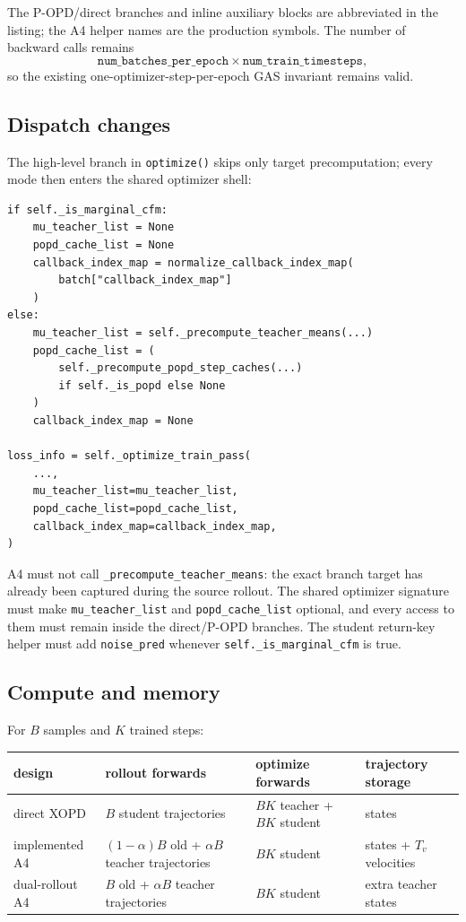 \documentclass[11pt,a4paper]{article}
\theoremstyle{plain}
\theoremstyle{definition}
\begin{document}
The P-OPD/direct branches and inline auxiliary blocks are abbreviated in the listing; the A4
helper names are the production symbols.  The number of backward calls remains
\[
\texttt{num\_batches\_per\_epoch}
\times
\texttt{num\_train\_timesteps},
\]
so the existing one-optimizer-step-per-epoch GAS invariant remains valid.

\subsection{Dispatch changes}

The high-level branch in \texttt{optimize()} skips only target precomputation; every mode
then enters the shared optimizer shell:
\begin{lstlisting}[style=python,caption={Implemented target-mode dispatch, abbreviated.}]
if self._is_marginal_cfm:
    mu_teacher_list = None
    popd_cache_list = None
    callback_index_map = normalize_callback_index_map(
        batch["callback_index_map"]
    )
else:
    mu_teacher_list = self._precompute_teacher_means(...)
    popd_cache_list = (
        self._precompute_popd_step_caches(...)
        if self._is_popd else None
    )
    callback_index_map = None

loss_info = self._optimize_train_pass(
    ...,
    mu_teacher_list=mu_teacher_list,
    popd_cache_list=popd_cache_list,
    callback_index_map=callback_index_map,
)
\end{lstlisting}

A4 must not call \texttt{\_precompute\_teacher\_means}: the exact branch target has already been
captured during the source rollout.  The shared optimizer signature must make
\texttt{mu\_teacher\_list} and \texttt{popd\_cache\_list} optional, and every access to them must
remain inside the direct/P-OPD branches.  The student return-key helper must add
\texttt{noise\_pred} whenever \texttt{self.\_is\_marginal\_cfm} is true.

\subsection{Compute and memory}

For $B$ samples and $K$ trained steps:
\begin{center}
\begin{tabular}{@{}
  >{\raggedright\arraybackslash}p{}
  >{\raggedright\arraybackslash}p{}
  >{\raggedright\arraybackslash}p{}
  >{\raggedright\arraybackslash}p{}
@{}}
\toprule
design & rollout forwards & optimize forwards & trajectory storage\\
\midrule
direct XOPD
& $B$ student trajectories
& $BK$ teacher + $BK$ student
& states\\
implemented A4
& $(1-\alpha)B$ old + $\alpha B$ teacher trajectories
& $BK$ student
& states + $T_v$ velocities\\
dual-rollout A4
& $B$ old + $\alpha B$ teacher trajectories
& $BK$ student
& extra teacher states\\
\bottomrule
\end{tabular}
\end{center}
\end{document}
